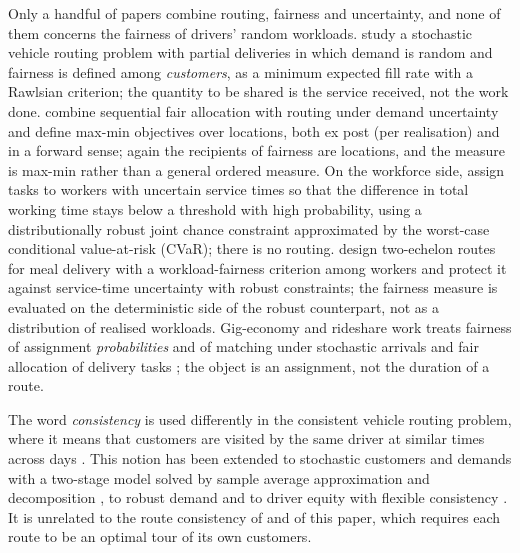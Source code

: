 \documentclass[11pt]{article}
\theoremstyle{definition}
\begin{document}
Only a handful of papers combine routing, fairness and uncertainty, and none
of them concerns the fairness of drivers' random workloads.
\citet{kinable2026fair} study a stochastic vehicle routing problem with
partial deliveries in which demand is random and fairness is defined among
\emph{customers}, as a minimum expected fill rate with a Rawlsian criterion;
the quantity to be shared is the service received, not the work done. \citet{gao2026sequential} combine sequential fair allocation with
routing under demand uncertainty and define max-min objectives over
locations, both ex post (per realisation) and in a forward sense; again the
recipients of fairness are locations, and the measure is max-min rather
than a general ordered measure. On the workforce side, \citet{anh2022workload}
assign tasks to workers with uncertain service times so that the difference
in total working time stays below a threshold with high probability, using a
distributionally robust joint chance constraint approximated by the worst-case
conditional value-at-risk (CVaR); there is no routing. \citet{lin2022robust} design two-echelon routes
for meal delivery with a workload-fairness criterion among workers and
protect it against service-time uncertainty with robust constraints; the
fairness measure is evaluated on the deterministic side of the robust
counterpart, not as a distribution of realised workloads. Gig-economy and
rideshare work treats fairness of assignment \emph{probabilities} and of
matching under stochastic arrivals \citep{singh2023fairassign,nanda2020balancing}
and fair allocation of delivery tasks \citep{basik2021fair,hosseini2025algorithmic};
the object is an assignment, not the duration of a route.

The word \emph{consistency} is used differently in the consistent vehicle
routing problem, where it means that customers are visited by the same driver
at similar times across days \citep{groer2009consistent,kovacs2015generalized}.
This notion has been extended to stochastic customers and demands with a
two-stage model solved by sample average approximation and decomposition
\citep{alvarez2024consistent}, to robust demand \citep{wu2025exact} and to
driver equity with flexible consistency \citep{yu2024consistent}. It is
unrelated to the route consistency of \citet{ljubic2026fair} and of this
paper, which requires each route to be an optimal tour of its own customers.
\end{document}
